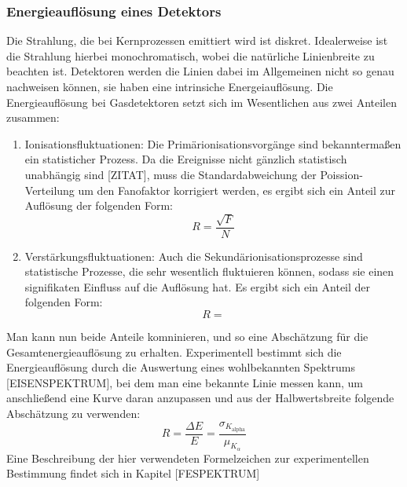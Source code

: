 			\subsubsection{Energieauflösung eines Detektors}
				Die Strahlung, die bei Kernprozessen emittiert wird ist diskret. Idealerweise ist die Strahlung hierbei monochromatisch, wobei die natürliche Linienbreite zu beachten ist. Detektoren werden die Linien dabei im Allgemeinen nicht so genau nachweisen können, sie haben eine intrinsiche Energeiauflösung. Die Energieauflösung bei Gasdetektoren setzt sich im Wesentlichen aus zwei Anteilen zusammen:
				\begin{enumerate}
					\item Ionisationsfluktuationen: Die Primärionisationsvorgänge sind bekanntermaßen ein statisticher Prozess. Da die Ereignisse nicht gänzlich statistisch unabhängig sind [ZITAT], muss die Standardabweichung der Poission-Verteilung um den Fanofaktor korrigiert werden, es ergibt sich ein Anteil zur Auflösung der folgenden Form:
					\begin{equation*}
						R=\frac{\sqrt{F}}{N}
					\end{equation*}
					\item Verstärkungsfluktuationen: Auch die Sekundärionisationsprozesse sind statistische Prozesse, die sehr wesentlich fluktuieren können, sodass sie einen signifikaten Einfluss auf die Auflösung hat. Es ergibt sich ein Anteil der folgenden Form:
					\begin{equation*}
						R= 
					\end{equation*}
				\end{enumerate}
				Man kann nun beide Anteile komninieren, und so eine Abschätzung  für die Gesamtenergieauflösung zu erhalten. Experimentell bestimmt sich die Energieauflösung durch die Auswertung eines wohlbekannten Spektrums [EISENSPEKTRUM], bei dem man eine bekannte Linie messen kann, um anschließend eine Kurve daran anzupassen und aus der Halbwertsbreite folgende Abschätzung zu verwenden:
				\begin{equation*}
					R=\frac{\Delta E}{E}= \frac{\sigma_{K_{\text{alpha}}}}{\mu_{K_{\alpha}}}
				\end{equation*}
				Eine Beschreibung der hier verwendeten Formelzeichen zur experimentellen Bestimmung findet sich in Kapitel [FESPEKTRUM]
			
			

